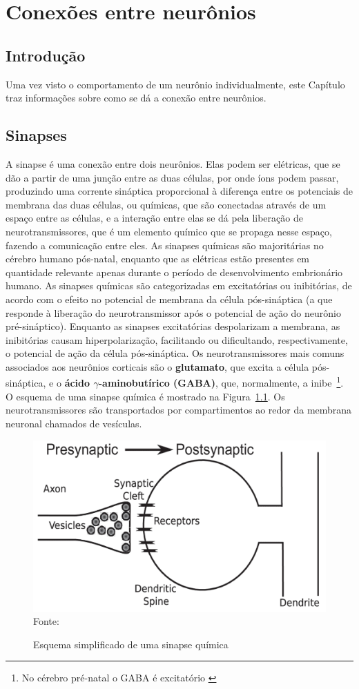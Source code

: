 \chapter{Conexões entre neurônios}\label{cap:conexoes}
\section{Introdução}\label{sec:conexoes_intro}
Uma vez visto o comportamento de um neurônio individualmente, este Capítulo traz informações sobre como se dá a conexão entre neurônios.
\section{Sinapses}\label{sec:sinapses}
A sinapse é uma conexão entre dois neurônios. Elas podem ser elétricas, que se dão a partir de uma junção entre as duas células, por onde íons podem passar, produzindo uma corrente sináptica proporcional à diferença entre os potenciais de membrana das duas células, ou químicas, que são conectadas através de um espaço entre as células, e a interação entre elas se dá pela liberação de neurotransmissores, que é um elemento químico que se propaga nesse espaço, fazendo a comunicação entre eles. As sinapses químicas são majoritárias no cérebro humano pós-natal, enquanto que as elétricas estão presentes em quantidade relevante apenas durante o período de desenvolvimento embrionário humano. As sinapses químicas são categorizadas em excitatórias ou inibitórias, de acordo com o efeito no potencial de membrana da célula pós-sináptica (a que responde à liberação do neurotransmissor após o potencial de ação do neurônio pré-sináptico). Enquanto as sinapses excitatórias despolarizam a membrana, as inibitórias causam hiperpolarização, facilitando ou dificultando, respectivamente, o potencial de ação da célula pós-sináptica. Os neurotransmissores mais comuns associados aos neurônios corticais são o \textbf{glutamato}, que excita a célula pós-sináptica, e o \textbf{ácido $\gamma$-aminobutírico (GABA)}, que, normalmente, a inibe~\footnote{No cérebro pré-natal o GABA é excitatório \cite{ben-ari_excitatory_2002}}.
O esquema de uma sinapse química é mostrado na Figura~\ref{fig:sinapses}. Os neurotransmissores são transportados por compartimentos ao redor da membrana neuronal chamados de vesículas.
\begin{figure}[tb]
	\centering
	\caption{Esquema simplificado de uma sinapse química}
	\label{fig:sinapses}
	\includegraphics[width=0.7\linewidth]{figs/sinapses}\\
	\small{Fonte: \cite{miller_introductory_2018}}
\end{figure}


